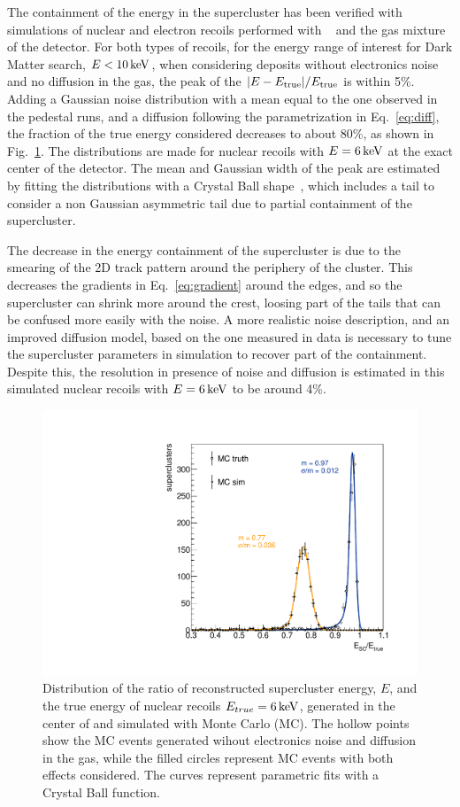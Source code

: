 The containment of the energy in the supercluster has been verified
with simulations of nuclear and electron recoils performed with
\GEANTfour~\cite{GEANT4} and the gas mixture of the \lemon detector.
For both types of recoils, for the energy range of interest for Dark
Matter search, \eg $E<10\,\textrm{ke\hspace{-.08em}V}$, when considering deposits without
electronics noise and no diffusion in the gas, the peak of the
$\vert E-E_\textrm{true} \vert/E_\textrm{true}$ is within 5\%. Adding a
Gaussian noise distribution with a mean equal to the one observed in
the pedestal runs, and a diffusion following the parametrization in
Eq.~\ref{eq:diff}, the fraction of the true energy considered
decreases to about 80\%, as shown in Fig.~\ref{fig:eoveretrue}. The
distributions are made for nuclear recoils with $E=6\,\textrm{ke\hspace{-.08em}V}$ at the exact
center of the \lemon detector. The mean and Gaussian width of the peak
are estimated by fitting the distributions with a Crystal Ball
shape~\cite{Oreglia:1980cs,Gaiser:1982yw}, which includes a tail to
consider a non Gaussian asymmetric tail due to partial containment of
the supercluster.

The decrease in the energy containment of the supercluster is due to
the smearing of the 2D track pattern around the periphery of the
cluster.  This decreases the gradients in Eq.~\ref{eq:gradient} around
the edges, and so the supercluster can shrink more around the crest,
loosing part of the tails that can be confused more easily with the
noise.  A more realistic noise description, and an improved diffusion
model, based on the one measured in data is necessary to tune the
supercluster parameters in simulation to recover part of the
containment. Despite this, the resolution in presence of noise and
diffusion is estimated in this simulated nuclear recoils with
$E=6\,\textrm{ke\hspace{-.08em}V}$ to be around 4\%.
%
\begin{figure}[ht]
  \begin{center} \includegraphics[width=0.49\linewidth]{figures/eoveretrue} \caption{Distribution
    of the ratio of reconstructed supercluster energy, $E$, and the
    true energy of nuclear recoils $E_{true}=6\,\textrm{ke\hspace{-.08em}V}$, generated in the
    center of \lemon and simulated with \GEANTfour Monte Carlo
    (MC). The hollow points show the MC events generated wihout
    electronics noise and diffusion in the gas, while the filled
    circles represent MC events with both effects considered. The
    curves represent parametric fits with a Crystal Ball
    function.\label{fig:eoveretrue}} \end{center}
\end{figure}
%

